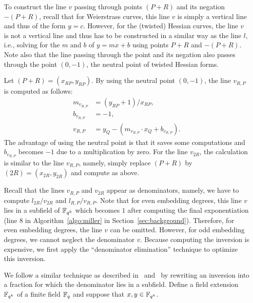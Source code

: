 To construct the line $v$ passing through points $(P+R)$ and its negation $-(P+R)$,
recall that for Weierstrass curves,
this line $v$ is simply a vertical line
and thus of the form $y = c$.
However, for the (twisted) Hessian curves, the line $v$ is not a vertical line
and thus has to be constructed in a similar way as the line $l$,
i.e., solving for the $m$ and $b$ of $y = mx + b$ using points $P+R$ and $-(P+R)$.
Note also that the line passing through the point and its negation also passes through
the point $(0,-1)$, the neutral point of twisted Hessian forms.

Let $(P+R) = (x_{RP},y_{RP})$.
By using the neutral point $(0,-1)$,
the line $v_{R,P}$ is computed as follows:
\begin{align*}
m_{v_{R,P}} &= (y_{RP} + 1) / x_{RP},	\\
b_{v_{R,P}} &= -1,			\\
v_{R,P} &= y_Q - (m_{v_{R,P}} \cdot x_Q + b_{v_{R,P}}).
\end{align*}
The advantage of using the neutral point is that
it saves some computations and $b_{v_{R,P}}$ becomes $-1$
due to a multiplication by zero.
For the line $v_{2R}$,
the calculation is similar to the line $v_{R,P}$,
namely,
simply replace $(P+R)$ by $(2R) = (x_{2R}, y_{2R})$
and compute as above.

Recall that the lines $v_{R,P}$ and $v_{2R}$ appear as denominators,
namely, we have to compute $l_{2R}/v_{2R}$ and $l_{R,P}/v_{R,P}$.
Note that for even embedding degrees,
this line $v$ lies in a subfield of $\mathbb{F}_{q^k}$
which becomes $1$ after computing the final exponentiation
({line 8} in Algorithm~\ref{algo:miller} in Section~\ref{sec:background}).
Therefore, for even embedding degrees, the line $v$ can be omitted.
However, for odd embedding degrees, we cannot neglect the denominator $v$.
Because computing the inversion is expensive,
we first apply the ``denominator elimination'' technique to optimize this inversion.


We follow a similar technique as described in~\cite{2008/lin} and~\cite{2009/deg15}
by rewriting an inversion into a fraction for which the denominator lies in a subfield.
Define a field extension $\mathbb{F}_{q^k}$ of a finite field $\mathbb{F}_{q}$ and suppose that $x,y \in \mathbb{F}_{q^k}$.

